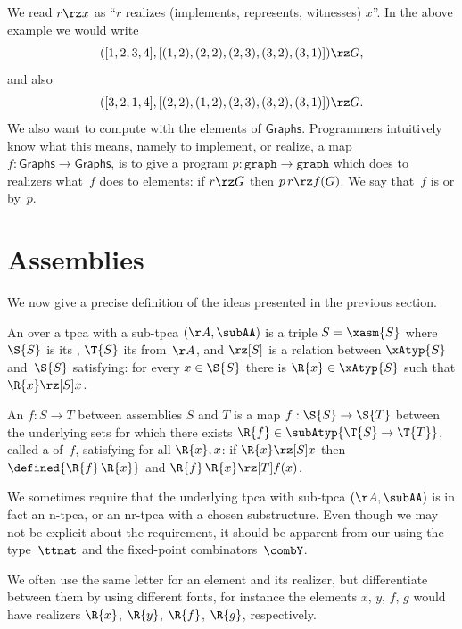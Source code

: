 %
We read $r \rz x$ as ``$r$ realizes (implements, represents, witnesses) $x$''. In the above example we would write
%
\begin{equation*}
([1, 2, 3, 4], [(1,2), (2,2), (2,3), (3,2), (3,1)]) \rz G,
\end{equation*}
%
and also
%
\begin{equation*}
([3, 2, 1, 4], [(2,2), (1,2), (2,3), (3,2), (3,1)]) \rz G.
\end{equation*}
%
We also want to compute with the elements of $\mathsf{Graphs}$.
%
Programmers intuitively know what this means, namely to implement, or realize, a map $f : \mathsf{Graphs} \to \mathsf{Graphs}$, is to give a program $p : \mathtt{graph} \to \mathtt{graph}$ which does to realizers what~$f$ does to elements: if $r \rz G$ then $p \, r \rz f(G)$. We say that~$f$ is  or  by~$p$.

\section{Assemblies}
\label{sec:assemblies}

We now give a precise definition of the ideas presented in the previous section.

\begin{definition}
  An  over a tpca with a sub-tpca $(\AA, \subAA)$ is a triple
  $S = \xasm{S}$ where $\S{S}$ is its , $\T{S}$ its  from~$\AA$, and $\rz[S]$ is a relation between $\xAtyp{S}$ and~$\S{S}$
  satisfying: for every $x \in \S{S}$ there is $\R{x} \in \xAtyp{S}$ such that $\R{x} \rz[S] x$.

  An  $f : S \to T$ between assemblies $S$ and $T$ is a map $f : \S{S} \to \S{T}$
  between the underlying sets for which there exists $\R{f} \in \subAtyp{\T{S} \to \T{T}}$, called a 
  of~$f$, satisfying for all $\R{x}, x$: if $\R{x} \rz[S] x$ then $\defined{\R{f} \, \R{x}}$ and $\R{f} \, \R{x} \rz[T] f(x)$.
\end{definition}

\noindent
%
We sometimes require that the underlying tpca with sub-tpca $(\AA, \subAA)$ is in fact an n-tpca, or an nr-tpca with a chosen substructure. Even though we may not be explicit about the requirement, it should be apparent from our using the type~$\ttnat$ and the fixed-point combinators~$\combY$.

We often use the same letter for an element and its realizer, but differentiate between them by using different fonts, for instance the elements $x$, $y$, $f$, $g$ would have realizers $\R{x}$, $\R{y}$, $\R{f}$, $\R{g}$, respectively.

